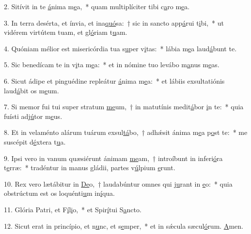 2. Sitívit in te \uline{á}nima m\uline{e}a,~* quam multiplíciter tibi c\uline{a}ro m\uline{e}a.\par 
3. In terra desérta, et ínvia, et ina\uline{quó}sa:~† sic in sancto app\uline{á}rui t\uline{i}bi,~* ut vidérem virtútem tuam, et gl\uline{ó}riam t\uline{u}am.\par 
4. Quóniam mélior est misericórdia tua s\uline{u}per v\uline{i}tas:~* lábia m\uline{e}a laud\uline{á}bunt te.\par 
5. Sic benedícam te in v\uline{i}ta m\uline{e}a:~* et in nómine tuo levábo m\uline{a}nus m\uline{e}as.\par 
6. Sicut ádipe et pinguédine repleátur \uline{á}nima m\uline{e}a:~* et lábiis exsultatiónis laud\uline{á}bit os m\uline{e}um.\par 
7. Si memor fui tui super stratum \uline{me}um,~† in matutínis medit\uline{á}bor \uline{i}n te:~* quia fuísti adj\uline{ú}tor m\uline{e}us.\par 
8. Et in velaménto alárum tuárum exsul\uline{tá}bo,~† adhǽsit ánima m\uline{e}a p\uline{o}st te:~* me suscépit d\uline{é}xtera t\uline{u}a.\par 
9. Ipsi vero in vanum quæsiérunt ánimam \uline{me}am,~† introíbunt in inferi\uline{ó}ra t\uline{e}rræ:~* tradéntur in manus gládii, partes v\uline{ú}lpium \uline{e}runt.\par 
10. Rex vero lætábitur in \uline{De}o,~† laudabúntur omnes qui j\uline{u}rant in \uline{e}o:~* quia obstrúctum est os loquénti\uline{u}m in\uline{í}qua.\par 
11. Glória Patri, et F\uline{í}l\uline{i}o,~* et Spir\uline{í}tui S\uline{a}ncto.\par 
12. Sicut erat in princípio, et n\uline{u}nc, et s\uline{e}mper,~* et in sǽcula sæcul\uline{ó}rum. \uline{A}men.\par 
